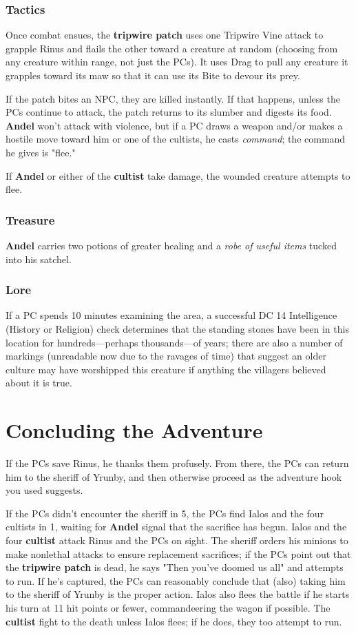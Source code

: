 \documentclass[10pt,a4paper,twoside,bg=print,twocolumn,openany,nodeprecatedcode]{dndbook}
\begin{document}
\subsubsection{Tactics}
Once combat ensues, the \textbf{tripwire patch} uses one Tripwire Vine attack to grapple Rinus and flails the other toward a creature at random (choosing from any creature within range, not just the PCs). It uses Drag to pull any creature it grapples toward its maw so that it can use its Bite to devour its prey.

If the patch bites an NPC, they are killed instantly. If that happens, unless the PCs continue to attack, the patch returns to its slumber and digests its food. \textbf{Andel} won't attack with violence, but if a PC draws a weapon and/or makes a hostile move toward him or one of the cultists, he casts \textit{command}; the command he gives is "flee."

If \textbf{Andel} or either of the \textbf{cultist} take damage, the wounded creature attempts to flee.

\subsubsection{Treasure}
\textbf{Andel} carries two potions of greater healing and a \textit{robe of useful items} tucked into his satchel.

\subsubsection{Lore}
If a PC spends 10 minutes examining the area, a successful DC 14 Intelligence (History or Religion) check determines that the standing stones have been in this location for hundreds—perhaps thousands—of years; there are also a number of markings (unreadable now due to the ravages of time) that suggest an older culture may have worshipped this creature if anything the villagers believed about it is true.

\section{Concluding the Adventure}
If the PCs save Rinus, he thanks them profusely. From there, the PCs can return him to the sheriff of Yrunby, and then otherwise proceed as the adventure hook you used suggests.

If the PCs didn't encounter the sheriff in 5, the PCs find Ialos and the four cultists in 1, waiting for \textbf{Andel} signal that the sacrifice has begun. Ialos and the four \textbf{cultist} attack Rinus and the PCs on sight. The sheriff orders his minions to make nonlethal attacks to ensure replacement sacrifices; if the PCs point out that the \textbf{tripwire patch} is dead, he says "Then you've doomed us all" and attempts to run. If he's captured, the PCs can reasonably conclude that (also) taking him to the sheriff of Yrunby is the proper action. Ialos also flees the battle if he starts his turn at 11 hit points or fewer, commandeering the wagon if possible. The \textbf{cultist} fight to the death unless Ialos flees; if he does, they too attempt to run.
\end{document}
